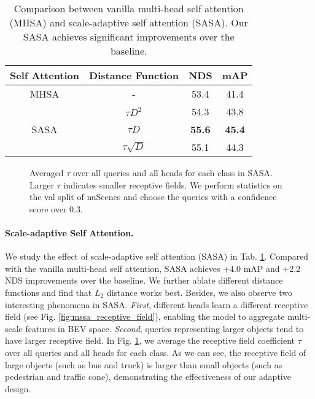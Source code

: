 \documentclass[10pt,twocolumn,letterpaper]{article}
\begin{document}
\begin{table}[t]
  \centering
  \begin{tabular}{c|c|cc}
    \toprule
    Self Attention & Distance Function & NDS & mAP \\
    \midrule
    MHSA & - & 53.4 & 41.4 \\
    \midrule
    \multirow{3}{*}{SASA} & $\tau D^2$ & 54.3 & 43.8 \\
    & $\tau D$ & \textbf{55.6} & \textbf{45.4} \\
    & $\tau \sqrt{D}$ & 55.1 & 44.3 \\
    \bottomrule
  \end{tabular}
  \caption{Comparison between vanilla multi-head self attention (MHSA) and scale-adaptive self attention (SASA). Our SASA achieves significant improvements over the baseline.}
  \label{table:mssa}
  \vspace{-5pt}
\end{table}

\begin{figure}[t]
  \centering
  \vspace{-5pt}
  \vspace{-10pt}
  \caption{Averaged $\tau$ over all queries and all heads for each class in SASA. Larger $\tau$ indicates smaller receptive fields. We perform statistics on the val split of nuScenes and choose the queries with a confidence score over 0.3.}
  \label{fig:sasa_class}
\end{figure}

\vspace{-5pt}
\paragraph{Scale-adaptive Self Attention.} We study the effect of scale-adaptive self attention (SASA) in Tab. \ref{table:mssa}.
Compared with the vanilla multi-head self attention, SASA achieves +4.0 mAP and +2.2 NDS improvements over the baseline. We further ablate different distance functions and find that $L_2$ distance works best. Besides, we also observe two interesting phenomena in SASA. \textit{First}, different heads learn a different receptive field (see Fig. \ref{fig:mssa_receptive_field}), enabling the model to aggregate multi-scale features in BEV space. \textit{Second}, queries representing larger objects tend to have larger receptive field. In Fig. \ref{fig:sasa_class}, we average the receptive field coefficient $\tau$ over all queries and all heads for each class. As we can see, the receptive field of large objects (such as bus and truck) is larger than small objects (such as pedestrian and traffic cone), demonstrating the effectiveness of our adaptive design.
\end{document}
